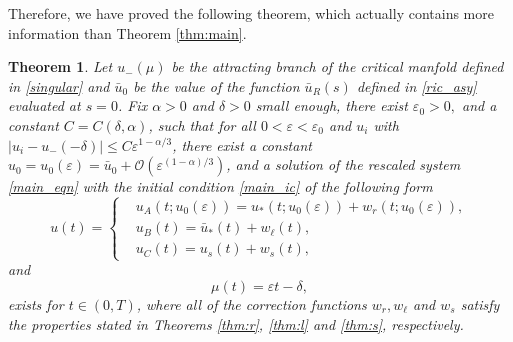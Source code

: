 \documentclass[letterpaper,11pt]{article}
\newcommand{\rmO}{\mathcal{O}}
\newcommand{\eps}{\varepsilon}
\numberwithin{equation}{section}
\theoremstyle{plain}
\newtheorem{theorem}{Theorem}[section]
\begin{document}
Therefore, we have proved the following theorem, which actually contains more information than Theorem \ref{thm:main}.
\begin{theorem}\label{thm:glue}
Let $u_-(\mu)$ be the attracting branch of the critical manfold defined in \eqref{singular} and $\bar{u}_0$ be the value of the function $\bar{u}_R(s)$ defined in \eqref{ric_asy} evaluated at $s=0$.
Fix $\alpha>0$ and $\delta>0$ small enough, there exist $\eps_0>0,$ and a constant $C=C(\delta,\alpha)$, such that for all $0<\eps<\eps_0$ and $u_i$ with $|u_i - u_-(-\delta)| \le C\eps^{1-\alpha/3}$, there exist a constant $u_0= u_0(\eps) = \bar{u}_0 + \rmO(\eps^{(1-\alpha)/3})$, and a solution of the rescaled system 
\eqref{main_eqn} with the initial condition
\eqref{main_ic} of the following form
\begin{equation}
u(t)=\begin{cases}
&u_A(t; u_0(\eps))= u_*(t;u_0(\eps)) + w_r(t;u_0(\eps)), \\
&u_B(t)=\bar{u}_*(t) + w_\ell(t), \\
&u_C(t)=u_s(t) + w_s(t),
\end{cases}
\end{equation}
and 
\begin{equation}
\mu(t) = \eps t -\delta,
\end{equation}
exists for $t \in (0,T)$, where all of the correction functions $w_r, w_\ell$ and $w_s$ satisfy the properties stated in Theorems \ref{thm:r}, \ref{thm:l} and \ref{thm:s}, respectively.
\end{theorem}
\end{document}
